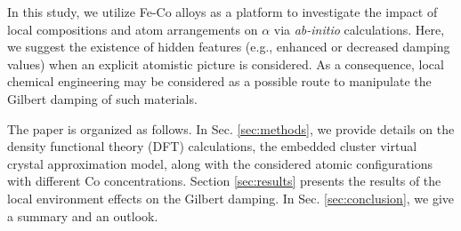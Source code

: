 In this study, we utilize Fe-Co alloys as a platform to investigate the impact of local compositions and atom arrangements on $\alpha$ via \textit{ab-initio} calculations. Here, we suggest the existence of hidden features (e.g., enhanced or decreased damping values) when an explicit atomistic picture is considered. As a consequence, local chemical engineering may be considered as a possible route to manipulate the Gilbert damping of such materials. 

The paper is organized as follows. In Sec. \ref{sec:methods}, we provide details on the density functional theory (DFT) calculations, the embedded cluster virtual crystal approximation model, along with the considered atomic configurations with different Co concentrations. Section \ref{sec:results} presents the results of the local environment effects on the Gilbert damping. In Sec. \ref{sec:conclusion}, we give a summary and an outlook.